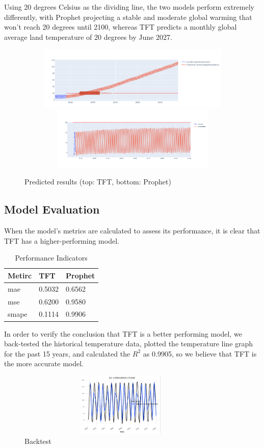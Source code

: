 \documentclass{apmcmthesis}
\begin{document}
Using 20 degrees Celsius as the dividing line, the two models perform extremely differently, with Prophet projecting a stable and moderate global warming that won't reach 20 degrees until 2100, whereas TFT predicts a monthly global average land temperature of 20 degrees by June 2027.
\begin{figure}[!h]
    \centering
    \includegraphics[width=13cm,height=3cm]{APMCMThesis/figures/pro.png} \\
    \includegraphics[width=13cm,height=3cm]{APMCMThesis/figures/model1.png}
    \caption{Predicted results (top: TFT, bottom: Prophet)}
    \label{fig:my_label}
\end{figure}

\subsection{Model Evaluation}
When the model's metrics are calculated to assess its performance, it is clear that TFT has a higher-performing model.
\begin{table}[!h]
\centering
\begin{tabular}{@{}lll@{}}
\toprule
Metirc & TFT    & Prophet \\ \midrule
mae    & 0.5032 & 0.6562 \\
mse    & 0.6200 & 0.9580 \\
smape  & 0.1114 & 0.9906   \\ \bottomrule
\end{tabular}
\caption{Performance Indicators}
\end{table}

In order to verify the conclusion that TFT is a better performing model, we back-tested the historical temperature data, plotted the temperature line graph for the past 15 years, and calculated the $R^2$ as 0.9905, so we believe that TFT is the more accurate model.
\begin{figure}
    \centering
    \includegraphics[width=10cm,height=3cm]{APMCMThesis/figures/R2.png}
    \caption{Backtest}
    \label{fig:my_label}
\end{figure}
\end{document}
